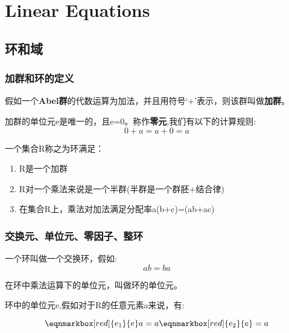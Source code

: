 
\chapter{Linear Equations}
\section{环和域}
\subsection{加群和环的定义}
\begin{definition}[\textbf{加群}]
	假如一个\textbf{Abel群}的代数运算为加法，并且用符号‘+’表示，则该群叫做\textbf{加群}。

\end{definition}

\begin{remark}
	加群的单位元e是唯一的，且e=0。称作\textbf{零元},我们有以下的计算规则:
	\[
		0+a=a+0=a
	\]
\end{remark}

\begin{definition}[\textbf{环}]
	一个集合R称之为环满足：
	\begin{enumerate}
		\item R是一个加群
		\item R对一个乘法来说是一个半群(半群是一个群胚+结合律)
		\item 在集合R上，乘法对加法满足分配率a(b+c)=(ab+ac) \end{enumerate}
\end{definition}

\subsection{交换元、单位元、零因子、整环}
\begin{definition}
	一个环叫做一个交换环，假如:\[
		ab = ba
	\]
\end{definition}

在环中乘法运算下的单位元，叫做环的单位元。

\newpage

\begin{definition}
	环中的单位元e,假如对于R的任意元素a来说，有:


	\[
		\eqnmarkbox[red]{e_1}{e}a = a \eqnmarkbox[red]{e_2}{e} = a
	\]



\end{definition}


